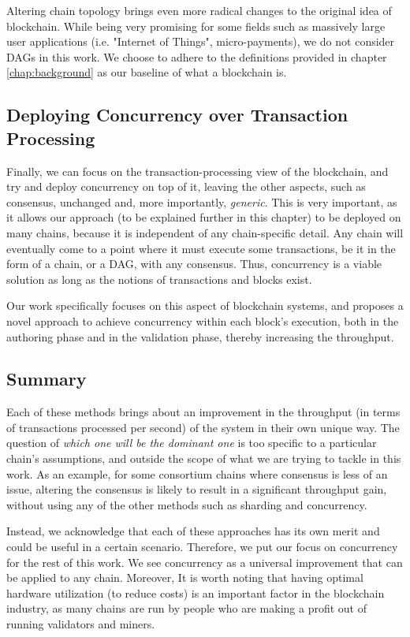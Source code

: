 Altering chain topology brings even more radical changes to the original idea of blockchain. While
being very promising for some fields such as massively large user applications (i.e. "Internet of
Things", micro-payments), we do not consider DAGs in this work. We choose to adhere to the
definitions provided in chapter \ref{chap:background} as our baseline of what a blockchain is.

\subsection{Deploying Concurrency over Transaction Processing}
\label{chap_approach:subsec:out_of_box_concurrency}

Finally, we can focus on the transaction-processing view of the blockchain, and try and deploy
concurrency on top of it, leaving the other aspects, such as consensus, unchanged and, more
importantly, \textit{generic}. This is very important, as it allows our approach (to be explained
further in this chapter) to be deployed on many chains, because it is independent of any
chain-specific detail. Any chain will eventually come to a point where it must execute some
transactions, be it in the form of a chain, or a DAG, with any consensus. Thus, concurrency is a
viable solution as long as the notions of transactions and blocks exist.

Our work specifically focuses on this aspect of blockchain systems, and proposes a novel approach to
achieve concurrency within each block's execution, both in the authoring phase and in the validation
phase, thereby increasing the throughput.

\subsection{Summary} \label{chap_bg:subsec:summary_speedup}

Each of these methods brings about an improvement in the throughput (in terms of transactions
processed per second) of the system in their own unique way. The question of \textit{which one will
be the dominant one} is too specific to a particular chain's assumptions, and outside the scope of
what we are trying to tackle in this work. As an example, for some consortium chains where consensus
is less of an issue, altering the consensus is likely to result in a significant throughput gain,
without using any of the other methods such as sharding and concurrency.

Instead, we acknowledge that each of these approaches has its own merit and could be useful in a
certain scenario. Therefore, we put our focus on concurrency for the rest of this work. We see concurrency as a universal improvement that can be applied to any chain. Moreover, It is worth
noting that having optimal hardware utilization (to reduce costs) is an important factor in the
blockchain industry, as many chains are run by people who are making a profit out of running
validators and miners.

